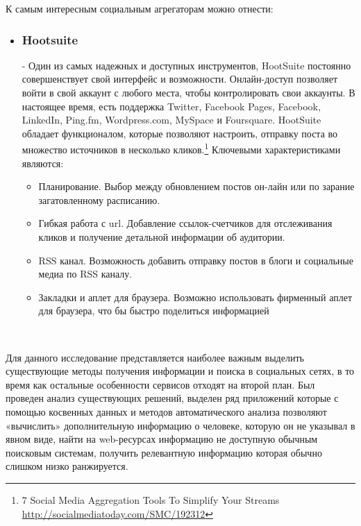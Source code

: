 К самым интересным социальным агрегаторам можно отнести:
\begin{itemize}
\item \subsubsection{Hootsuite} - Один из самых надежных и доступных инструментов,  HootSuite постоянно совершенствует свой интерфейс и возможности. Онлайн-доступ позволяет войти в свой аккаунт с любого места, чтобы контролировать свои аккаунты. В настоящее время, есть поддержка Twitter, Facebook Pages, Facebook, LinkedIn, Ping.fm, Wordpress.com, MySpace и Foursquare. HootSuite обладает функционалом, которые позволяют настроить, отправку поста во множество источников в несколько кликов.\footnote{7 Social Media Aggregation Tools To Simplify Your Streams  \url{http://socialmediatoday.com/SMC/192312}} Ключевыми характеристиками являются:
	\begin{itemize}
	\item  Планирование. Выбор между обновлением постов он-лайн или по зарание загатовленному расписанию.
	\item Гибкая работа с url. Добавление ссылок-счетчиков для отслеживания кликов и получение детальной информации об аудитории.
	\item  RSS канал. Возможность добавить отправку постов в блоги и социальные медиа по RSS каналу.
	\item Закладки и аплет для браузера. Возможно использовать фирменный аплет для браузера, что бы быстро поделиться информацией
	\end{itemize}

\end{itemize}
\

Для данного исследование представляется наиболее важным выделить существующие методы получения информации и поиска в социальных сетях, в то время как остальные особенности сервисов отходят на второй план. Был проведен анализ существующих решений, выделен ряд приложений которые с помощью косвенных данных и методов автоматического анализа позволяют «вычислить» дополнительную информацию о человеке, которую он не указывал в явном виде, найти на web-ресурсах информацию не доступную обычным поисковым системам, получить релевантную информацию которая обычно слишком низко ранжируется. %

